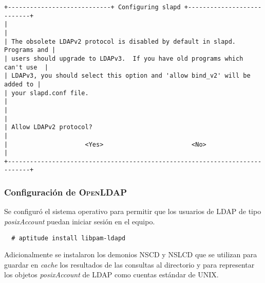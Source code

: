 {
\scriptsize
\linespread{1}
\begin{verbatim}
+----------------------------+ Configuring slapd +---------------------------+
|                                                                            |
| The obsolete LDAPv2 protocol is disabled by default in slapd. Programs and |
| users should upgrade to LDAPv3.  If you have old programs which can't use  |
| LDAPv3, you should select this option and 'allow bind_v2' will be added to |
| your slapd.conf file.                                                      |
|                                                                            |
| Allow LDAPv2 protocol?                                                     |
|                     <Yes>                        <No>                      |
+----------------------------------------------------------------------------+
\end{verbatim}
}

          \subsubsection {Configuraci\'{o}n de \textsc{OpenLDAP}}

Se configur\'{o} el sistema operativo para permitir que los usuarios de \textsc{LDAP} de tipo \textit{posixAccount} puedan iniciar sesi\'{o}n en el equipo.

{
\scriptsize
\linespread{1}
\begin{verbatim}
  # aptitude install libpam-ldapd
\end{verbatim}
}

Adicionalmente se instalaron los demonios \textsc{NSCD} y \textsc{NSLCD} que se utilizan para guardar en \textit{cache} los resultados de las consultas al directorio y para representar los objetos \textit{posixAccount} de \textsc{LDAP} como cuentas est\'{a}ndar de \textsc{UNIX}.


